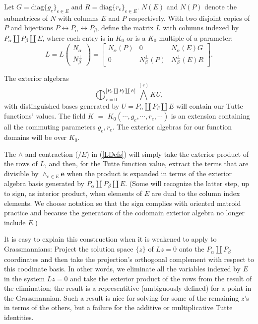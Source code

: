\documentclass[Unicode]{cedram-alco}
\newcommand{\ext}[1]{\ensuremath{\mathbf{#1}}}
\newcommand{\Nal}{\ensuremath{N_{\alpha}}}
\newcommand{\NbePe}{\ensuremath{N_{\beta}^{\perp}}}
\newcommand{\dunion}{\coprod}
\begin{document}
Let
$G=\text{diag}\{g_e\}_{e\in E} $ and $R=\text{diag}\{r_e\}_{e\in E}$.
$N(E)$ and $N(P)$ denote the submatrices of $N$
with columns $E$ and $P$ respectively. With
two disjoint copies of $P$ and bijections
$P \leftrightarrow P_{\alpha}\leftrightarrow P_{\beta}$, define the matrix $L$
with columns indexed by $P_\alpha \dunion P_\beta \dunion E$, where each entry
is in $K_0$ or is a $K_0$ multiple of a parameter:
\begin{equation}\label{LmatrixDef}
    L = L\left(\begin{array}{cc} {\Nal} \\ {\NbePe}  \end{array}\right)
    = \left[\begin{array}{c|c|c} \Nal(P)  &  0  &  \Nal(E)G \\  \hline
        0  & \NbePe(P)  &  \NbePe(E)R \end{array}\right].
\end{equation}


The exterior algebras
\[
\bigoplus_{r=0}^{\left|P_\alpha \dunion P_\beta \dunion E\right|} {\bigwedge}^{(r)} KU,
\]
with distinguished bases generated by $U=P_\alpha \dunion P_\beta \dunion E$
will contain our Tutte functions' values.
The 
field $K$ $=$ $K_0( \cdots, g_e , \cdots , r_e , \cdots )$
is an extension containing 
all the commuting parameters $g_e, r_e$.
The
exterior algebras for our function domains will be over $K_0$.

The $\wedge$ and contraction ($/E$) in (\ref{LDefs})
will simply take the exterior product of the rows of $L$, and
then, for the Tutte function value,
extract the terms that are divisible by $\wedge_{e \in E}\ext{e}$
when the product
is expanded in terms of the exterior algebra basis
generated by $P_\alpha \dunion P_\beta \dunion E$.
(Some will recognize the latter step, up to sign, as interior product,
when elements
of $E$ are dual to the column index elements.  We choose notation
so that the sign complies with oriented matroid practice\cite{OMBOOK} and
because the generators of the codomain exterior algebra no longer include $E$.)



It is easy to explain this construction when it is weakened
to apply to Grassmannians:
Project the solution space $\{z\}$ of $Lz=0$ onto
the $P_\alpha\dunion P_\beta$ coordinates and then take the projection's orthogonal
complement with respect to this coodinate  basis.
In other words, we eliminate all the variables
indexed by $E$ in the system $Lz=0$ and take the exterior product of the rows
from the result of the elimination; the result is a 
representitive (ambiguously defined) for a point in the Grassmannian.
Such a result is nice for solving for some of the remaining $z$'s in terms of
the others, but a failure
for the additive or multiplicative Tutte identities.
\end{document}
